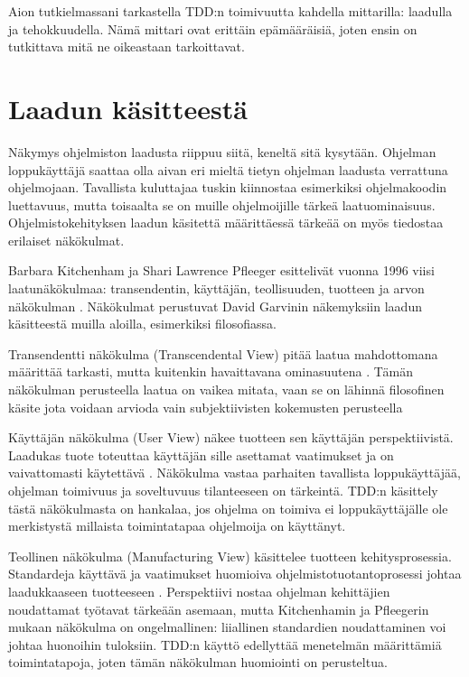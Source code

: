 \documentclass[finnish]{tktltiki2}
\theoremstyle{definition}
\theoremstyle{remark}
\begin{document}
Aion tutkielmassani tarkastella TDD:n toimivuutta kahdella mittarilla: laadulla ja tehokkuudella. Nämä mittari ovat erittäin epämääräisiä, joten ensin on tutkittava mitä ne oikeastaan tarkoittavat.


\section{Laadun käsitteestä}

Näkymys ohjelmiston laadusta riippuu siitä, keneltä sitä kysytään. Ohjelman loppukäyttäjä saattaa olla aivan eri mieltä tietyn ohjelman laadusta verrattuna ohjelmojaan. Tavallista kuluttajaa tuskin kiinnostaa esimerkiksi ohjelmakoodin luettavuus, mutta toisaalta se on muille ohjelmoijille tärkeä laatuominaisuus. Ohjelmistokehityksen laadun käsitettä määrittäessä tärkeää on myös tiedostaa erilaiset näkökulmat.

Barbara Kitchenham ja Shari Lawrence Pfleeger esittelivät vuonna 1996 viisi laatunäkökulmaa: transendentin, käyttäjän, teollisuuden, tuotteen ja arvon näkökulman \cite{Kitchenham96}. Näkökulmat perustuvat David Garvinin näkemyksiin laadun käsitteestä muilla aloilla, esimerkiksi filosofiassa.

Transendentti näkökulma (Transcendental View) pitää laatua mahdottomana määrittää tarkasti, mutta kuitenkin havaittavana ominasuutena \cite{Kitchenham96}. Tämän näkökulman perusteella laatua on vaikea mitata, vaan se on lähinnä filosofinen käsite jota voidaan arvioda vain subjektiivisten kokemusten perusteella

Käyttäjän näkökulma (User View) näkee tuotteen sen käyttäjän perspektiivistä. Laadukas tuote toteuttaa käyttäjän sille asettamat vaatimukset ja on vaivattomasti käytettävä \cite{Kitchenham96}. Näkökulma vastaa parhaiten tavallista loppukäyttäjää, ohjelman toimivuus ja soveltuvuus tilanteeseen on tärkeintä. TDD:n käsittely tästä näkökulmasta on hankalaa, jos ohjelma on toimiva ei loppukäyttäjälle ole merkistystä millaista toimintatapaa ohjelmoija on käyttänyt.

Teollinen näkökulma (Manufacturing View) käsittelee tuotteen kehitysprosessia. Standardeja käyttävä ja vaatimukset huomioiva ohjelmistotuotantoprosessi johtaa laadukkaaseen tuotteeseen \cite{Kitchenham96}. Perspektiivi nostaa ohjelman kehittäjien noudattamat työtavat tärkeään asemaan, mutta Kitchenhamin ja Pfleegerin mukaan näkökulma on ongelmallinen: liiallinen standardien noudattaminen voi johtaa huonoihin tuloksiin. TDD:n käyttö edellyttää menetelmän määrittämiä toimintatapoja, joten tämän näkökulman huomiointi on perusteltua.
\end{document}

